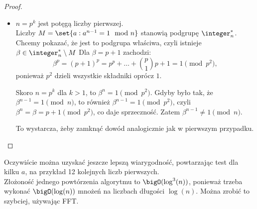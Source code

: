 \begin{proof}
\begin{itemize}
		\item \( n = p^k \) jest potęgą liczby pierwszej. \\
		      Liczby \( M = \set{a : a^{n-1} = 1 \mod n} \) stanowią podgrupę \( \integer_n^* \). Chcemy pokazać, że jest to podgrupa właściwa, czyli istnieje \( \beta \in \integer_n^* \setminus M \)
		      Dla \( \beta = p + 1 \) zachodzi:
		      \[
			      \beta^p = (p + 1)^p = p^p + \ldots + \binom{p}{1} p + 1 = 1 \pmod{p^2},
		      \]
		      ponieważ \( p^2 \) dzieli wszystkie składniki oprócz \( 1 \).

		      Skoro \( n = p^k \) dla \( k > 1 \), to \( \beta^n = 1 \pmod{p^2} \).
		      Gdyby było tak, że \( \beta^{n-1} = 1 \pmod{n} \), to również \( \beta^{n-1} = 1 \pmod{p^2} \), czyli \( \beta^n = \beta = p + 1 \pmod{p^2} \), co daje sprzeczność. Zatem \( \beta^{n-1} \neq 1 \pmod{n} \).

		      To wystarcza, żeby zamknąć dowód analogicznie jak w pierwszym przypadku.
	\end{itemize}
\end{proof}
Oczywiście można uzyskać jeszcze lepszą wiarygodność, powtarzając test dla kilku \( a \), na przykład 12 kolejnych liczb pierwszych. \\
Złożoność jednego powtórzenia algorytmu to \( \bigO(\log^3(n)) \), ponieważ trzeba wykonać \( \bigO(\log(n)) \) mnożeń na liczbach długości \( \log(n) \). Można zrobić to szybciej, używając FFT.
